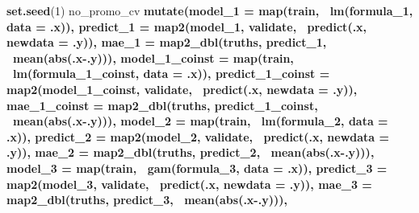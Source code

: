 \documentclass[]{article}
\newenvironment{Shaded}{\begin{snugshade}}{\end{snugshade}}
\newcommand{\DataTypeTok}[1]{\textcolor[rgb]{0.13,0.29,0.53}{#1}}
\newcommand{\DecValTok}[1]{\textcolor[rgb]{0.00,0.00,0.81}{#1}}
\newcommand{\KeywordTok}[1]{\textcolor[rgb]{0.13,0.29,0.53}{\textbf{#1}}}
\newcommand{\NormalTok}[1]{#1}
\newcommand{\OperatorTok}[1]{\textcolor[rgb]{0.81,0.36,0.00}{\textbf{#1}}}
\newcommand{\StringTok}[1]{\textcolor[rgb]{0.31,0.60,0.02}{#1}}
\begin{document}
\begin{Shaded}
\begin{Highlighting}[]
\KeywordTok{set.seed}\NormalTok{(}\DecValTok{1}\NormalTok{)}
\NormalTok{no_promo_cv }\OperatorTok{%>%}\StringTok{ }
\StringTok{  }\KeywordTok{mutate}\NormalTok{(}\DataTypeTok{model_1 =} \KeywordTok{map}\NormalTok{(train, }\OperatorTok{~}\KeywordTok{lm}\NormalTok{(formula_}\DecValTok{1}\NormalTok{, }\DataTypeTok{data =}\NormalTok{ .x)),}
         \DataTypeTok{predict_1 =} \KeywordTok{map2}\NormalTok{(model_}\DecValTok{1}\NormalTok{, validate, }\OperatorTok{~}\KeywordTok{predict}\NormalTok{(.x, }\DataTypeTok{newdata =}\NormalTok{ .y)),}
         \DataTypeTok{mae_1 =} \KeywordTok{map2_dbl}\NormalTok{(truths, predict_}\DecValTok{1}\NormalTok{, }\OperatorTok{~}\KeywordTok{mean}\NormalTok{(}\KeywordTok{abs}\NormalTok{(.x}\OperatorTok{-}\NormalTok{.y))),}
         \DataTypeTok{model_1_coinst =} \KeywordTok{map}\NormalTok{(train, }\OperatorTok{~}\KeywordTok{lm}\NormalTok{(formula_}\DecValTok{1}\NormalTok{_coinst, }\DataTypeTok{data =}\NormalTok{ .x)),}
         \DataTypeTok{predict_1_coinst =} \KeywordTok{map2}\NormalTok{(model_}\DecValTok{1}\NormalTok{_coinst, validate, }\OperatorTok{~}\KeywordTok{predict}\NormalTok{(.x, }\DataTypeTok{newdata =}\NormalTok{ .y)),}
         \DataTypeTok{mae_1_coinst =} \KeywordTok{map2_dbl}\NormalTok{(truths, predict_}\DecValTok{1}\NormalTok{_coinst, }\OperatorTok{~}\KeywordTok{mean}\NormalTok{(}\KeywordTok{abs}\NormalTok{(.x}\OperatorTok{-}\NormalTok{.y))),}
         \DataTypeTok{model_2 =} \KeywordTok{map}\NormalTok{(train, }\OperatorTok{~}\KeywordTok{lm}\NormalTok{(formula_}\DecValTok{2}\NormalTok{, }\DataTypeTok{data =}\NormalTok{ .x)),}
         \DataTypeTok{predict_2 =} \KeywordTok{map2}\NormalTok{(model_}\DecValTok{2}\NormalTok{, validate, }\OperatorTok{~}\KeywordTok{predict}\NormalTok{(.x, }\DataTypeTok{newdata =}\NormalTok{ .y)),}
         \DataTypeTok{mae_2 =} \KeywordTok{map2_dbl}\NormalTok{(truths, predict_}\DecValTok{2}\NormalTok{, }\OperatorTok{~}\KeywordTok{mean}\NormalTok{(}\KeywordTok{abs}\NormalTok{(.x}\OperatorTok{-}\NormalTok{.y))),}
         \DataTypeTok{model_3 =} \KeywordTok{map}\NormalTok{(train, }\OperatorTok{~}\KeywordTok{gam}\NormalTok{(formula_}\DecValTok{3}\NormalTok{, }\DataTypeTok{data =}\NormalTok{ .x)),}
         \DataTypeTok{predict_3 =} \KeywordTok{map2}\NormalTok{(model_}\DecValTok{3}\NormalTok{, validate, }\OperatorTok{~}\KeywordTok{predict}\NormalTok{(.x, }\DataTypeTok{newdata =}\NormalTok{ .y)),}
         \DataTypeTok{mae_3 =} \KeywordTok{map2_dbl}\NormalTok{(truths, predict_}\DecValTok{3}\NormalTok{, }\OperatorTok{~}\KeywordTok{mean}\NormalTok{(}\KeywordTok{abs}\NormalTok{(.x}\OperatorTok{-}\NormalTok{.y))),}
}
\end{Highlighting}
\end{Shaded}
\end{document}
